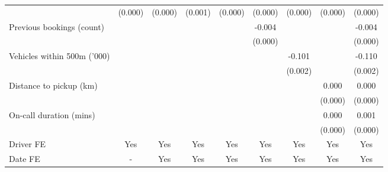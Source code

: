 {\begin{tabular}{l*{8}{S}}
                    &     (0.000)         &     (0.000)         &     (0.001)         &     (0.000)         &     (0.000)         &     (0.000)         &     (0.000)         &     (0.000)         \\
\addlinespace
Previous bookings (count)&                     &                     &                     &                     &      -0.004\sym{***}&                     &                     &      -0.004\sym{***}\\
                    &                     &                     &                     &                     &     (0.000)         &                     &                     &     (0.000)         \\
\addlinespace
Vehicles within 500m ('000)&                     &                     &                     &                     &                     &      -0.101\sym{***}&                     &      -0.110\sym{***}\\
                    &                     &                     &                     &                     &                     &     (0.002)         &                     &     (0.002)         \\
\addlinespace
Distance to pickup (km)&                     &                     &                     &                     &                     &                     &       0.000         &       0.000         \\
                    &                     &                     &                     &                     &                     &                     &     (0.000)         &     (0.000)         \\
\addlinespace
On-call duration (mins)&                     &                     &                     &                     &                     &                     &       0.000\sym{***}&       0.001\sym{***}\\
                    &                     &                     &                     &                     &                     &                     &     (0.000)         &     (0.000)         \\
\addlinespace
Driver FE           &       {Yes}         &       {Yes}         &       {Yes}         &       {Yes}         &       {Yes}         &       {Yes}         &       {Yes}         &       {Yes}         \\
\addlinespace
Date FE           &       {-}         &       {Yes}         &       {Yes}         &       {Yes}         &       {Yes}         &       {Yes}         &       {Yes}         &       {Yes}         \\

\end{tabular}}
